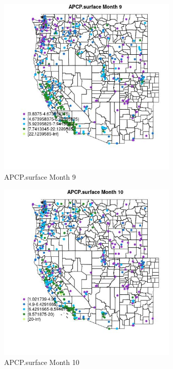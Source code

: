 \begin{figure} 
\centering  
\includegraphics[width=0.77\textwidth]{Code_Outputs/ML_input_report_ML_input_PM25_Step5_part_d_de_duplicated_aves_ML_input_MapObsMo9APCPsurface.jpg} 
\caption{\label{fig:ML_input_report_ML_input_PM25_Step5_part_d_de_duplicated_aves_ML_inputMapObsMo9APCPsurface}APCP.surface Month 9} 
\end{figure} 
 

\begin{figure} 
\centering  
\includegraphics[width=0.77\textwidth]{Code_Outputs/ML_input_report_ML_input_PM25_Step5_part_d_de_duplicated_aves_ML_input_MapObsMo10APCPsurface.jpg} 
\caption{\label{fig:ML_input_report_ML_input_PM25_Step5_part_d_de_duplicated_aves_ML_inputMapObsMo10APCPsurface}APCP.surface Month 10} 
\end{figure} 
 


